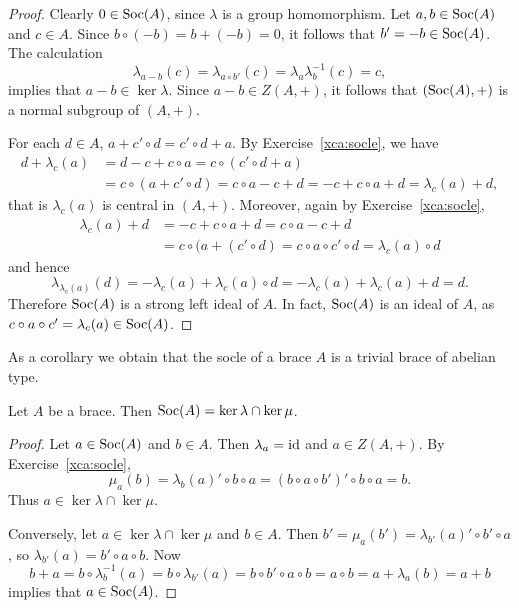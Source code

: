 	
	\begin{proof}
		Clearly $0\in\operatorname{Soc}(A)$, since $\lambda$ is a group homomorphism. Let $a,b\in\operatorname{Soc}(A)$ and $c\in A$. Since 
		$b\circ (-b)=b+(-b)=0$, it follows that 
		$b'=-b\in\operatorname{Soc}(A)$. The calculation 
		\[
		\lambda_{a-b}(c)=\lambda_{a\circ b'}(c)=\lambda_a\lambda^{-1}_b(c)=c,
		\]
 		implies that $a-b\in\ker\lambda$. Since $a-b\in Z(A,+)$, it follows that 
        $(\operatorname{Soc}(A),+)$ is a normal subgroup of $(A,+)$. 
        
        For each $d\in A$, $a+c'\circ d=c'\circ d+a$.  By Exercise~\ref{xca:socle}, we have 
        \begin{align*}
        d+\lambda_c(a) &= d-c+c\circ a
        =c\circ (c'\circ d+a)\\
        &= c\circ (a+c'\circ d)
        = c\circ a-c+d
        = -c+c\circ a+d
        = \lambda_c(a)+d,
        \end{align*}
        that is $\lambda_c(a)$ is central in $(A,+)$. Moreover, again by Exercise~\ref{xca:socle},
        \begin{align*}
            \lambda_c(a)+d &= -c+c\circ a+d 
            = c\circ a-c+d\\
            &= c\circ (a+(c'\circ d)
            = c\circ a\circ c'\circ d=\lambda_c(a)\circ d
        \end{align*}
        and hence 
        \[
        \lambda_{\lambda_c(a)}(d)=-\lambda_c(a)+\lambda_c(a)\circ d=-\lambda_c(a)+\lambda_c(a)+d=d.
        \]
        Therefore $\operatorname{Soc}(A)$ is a strong left ideal of $A$. In fact, $\operatorname{Soc}(A)$ is an ideal of $A$,
        as $c\circ a\circ c'=\lambda_c(a)\in\operatorname{Soc}(A)$.  
	\end{proof}

As a corollary we obtain that the socle of a 
brace $A$ is a trivial brace of abelian type. 

\begin{proposition}
    \label{pro:soc_kernels}
    Let $A$ be a brace. Then $\operatorname{Soc}(A)=\ker\lambda\cap\ker\mu$.
\end{proposition}

\begin{proof}
    Let $a\in\operatorname{Soc}(A)$ and $b\in A$. Then $\lambda_a=\operatorname{id}$ and $a\in Z(A,+)$. By Exercise~\ref{xca:socle}, \[\mu_a(b)=\lambda_b(a)'\circ b\circ a=(b\circ a\circ b')'\circ b\circ a=b.\]  Thus $a\in\ker\lambda\cap\ker\mu$. 
    
    Conversely, let $a\in\ker\lambda\cap\ker\mu$ and $b\in A$. Then $b'=\mu_a(b')=\lambda_{b'}(a)'\circ b'\circ a$, so
    $\lambda_{b'}(a)=b'\circ a\circ b$. Now 
    \[
    b+a=b\circ\lambda^{-1}_b(a)=b\circ\lambda_{b'}(a)=b\circ b'\circ a\circ b=a\circ b=a+\lambda_a(b)=a+b
    \]
    implies that $a\in\operatorname{Soc}(A)$. 
\end{proof}

